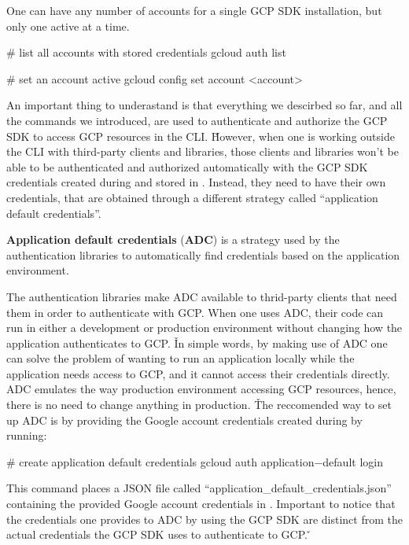 One can have any number of accounts for a single GCP SDK installation, but only one active at a time.
\begin{bash}
# list all accounts with stored credentials
gcloud auth list
\end{bash}

\begin{bash}
# set an account active
gcloud config set account <account>
\end{bash}

An important thing to underastand is that everything we descirbed so far, and all the commands we introduced,
are used to authenticate and authorize the GCP SDK to access GCP resources in the CLI. \v

However, when one is working outside the CLI with third-party clients and libraries, those clients and libraries
won't be able to be authenticated and authorized automatically with the GCP SDK credentials created during
 and stored in . Instead, they need to have their own credentials,
that are obtained through a different strategy called ``application default credentials''.

\textbf{Application default credentials} (\textbf{ADC}) is a strategy used by the authentication libraries to
automatically find credentials based on the application environment.
\ed

The authentication libraries make ADC available to thrid-party clients that need them in order to authenticate with
GCP\@. When one uses ADC, their code can run in either a development or production environment without changing how
the application authenticates to GCP. \v

In simple words, by making use of ADC one can solve the problem of wanting to run an application locally while the
application needs access to GCP, and it cannot access their credentials directly. ADC emulates the way production
environment accessing GCP resources, hence, there is no need to change anything in production. \v

The reccomended way to set up ADC is by providing the Google account credentials created during 
by running:
\begin{bash}
# create application default credentials
gcloud auth application$-$default login
\end{bash}

This command places a JSON file called ``application\_default\_credentials.json'' containing the provided Google
account credentials in . Important to notice that
the credentials one provides to ADC by using the GCP SDK are distinct from the actual credentials the GCP SDK uses
to authenticate to GCP\@. \v

